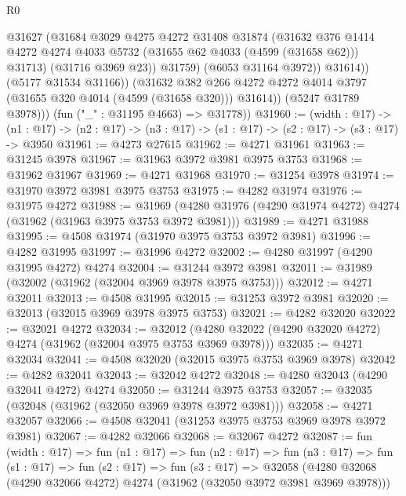 \begin{lexlean}{R0}
\begin{coremodule}
                      @31627
                      (@31684
                        @3029
                        @4275
                        @4272
                        @31408
                        @31874
                        (@31632
                          @376
                          @1414
                          @4272
                          @4274
                          @4033
                          @5732
                          (@31655 @62 @4033 (@4599 (@31658 @62)))
                          @31713)
                        (@31716 @3969 @23))
                      @31759)
                    (@6053 @31164 @3972))
                  @31614))
              (@5177 @31534 @31166))
            (@31632
              @382
              @266
              @4272
              @4272
              @4014
              @3797
              (@31655 @320 @4014 (@4599 (@31658 @320)))
              @31614))
          (@5247 @31789 @3978)))
      (fun ("_" : @31195 @4663) => @31778))
@31960 := (width : @17) ->
  (n1 : @17) -> (n2 : @17) -> (n3 : @17) -> (s1 : @17) -> (s2 : @17) -> (s3 : @17) -> @3950
@31961 := @4273 @27615
@31962 := @4271 @31961
@31963 := @31245 @3978
@31967 := @31963 @3972 @3981 @3975 @3753
@31968 := @31962 @31967
@31969 := @4271 @31968
@31970 := @31254 @3978
@31974 := @31970 @3972 @3981 @3975 @3753
@31975 := @4282 @31974
@31976 := @31975 @4272
@31988 := @31969 (@4280 @31976 (@4290 @31974 @4272) @4274 (@31962 (@31963 @3975 @3753 @3972 @3981)))
@31989 := @4271 @31988
@31995 := @4508 @31974 (@31970 @3975 @3753 @3972 @3981)
@31996 := @4282 @31995
@31997 := @31996 @4272
@32002 := @4280 @31997 (@4290 @31995 @4272) @4274
@32004 := @31244 @3972 @3981
@32011 := @31989 (@32002 (@31962 (@32004 @3969 @3978 @3975 @3753)))
@32012 := @4271 @32011
@32013 := @4508 @31995
@32015 := @31253 @3972 @3981
@32020 := @32013 (@32015 @3969 @3978 @3975 @3753)
@32021 := @4282 @32020
@32022 := @32021 @4272
@32034 := @32012 (@4280 @32022 (@4290 @32020 @4272) @4274 (@31962 (@32004 @3975 @3753 @3969 @3978)))
@32035 := @4271 @32034
@32041 := @4508 @32020 (@32015 @3975 @3753 @3969 @3978)
@32042 := @4282 @32041
@32043 := @32042 @4272
@32048 := @4280 @32043 (@4290 @32041 @4272) @4274
@32050 := @31244 @3975 @3753
@32057 := @32035 (@32048 (@31962 (@32050 @3969 @3978 @3972 @3981)))
@32058 := @4271 @32057
@32066 := @4508 @32041 (@31253 @3975 @3753 @3969 @3978 @3972 @3981)
@32067 := @4282 @32066
@32068 := @32067 @4272
@32087 := fun (width : @17) =>
  fun (n1 : @17) =>
  fun (n2 : @17) =>
  fun (n3 : @17) =>
  fun (s1 : @17) =>
  fun (s2 : @17) =>
  fun (s3 : @17) =>
  @32058 (@4280 @32068 (@4290 @32066 @4272) @4274 (@31962 (@32050 @3972 @3981 @3969 @3978)))

\end{coremodule}
\end{lexlean}
